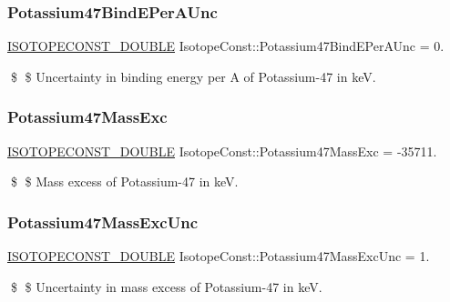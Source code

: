 \subsubsection{\texorpdfstring{Potassium47\+Bind\+E\+Per\+A\+Unc}{Potassium47BindEPerAUnc}}
{\footnotesize\ttfamily \mbox{\hyperlink{group___isotope_const-_macros_ga8f45a7272ce02c0b4c65c44636ed719a}{I\+S\+O\+T\+O\+P\+E\+C\+O\+N\+S\+T\+\_\+\+D\+O\+U\+B\+LE}} Isotope\+Const\+::\+Potassium47\+Bind\+E\+Per\+A\+Unc = 0.}

\$ \$ Uncertainty in binding energy per A of Potassium-\/47 in keV. \mbox{\label{group___isotope_const-_potassium-_k47_ga91696651c6e6d40101c8b411954b4839}} 
\subsubsection{\texorpdfstring{Potassium47\+Mass\+Exc}{Potassium47MassExc}}
{\footnotesize\ttfamily \mbox{\hyperlink{group___isotope_const-_macros_ga8f45a7272ce02c0b4c65c44636ed719a}{I\+S\+O\+T\+O\+P\+E\+C\+O\+N\+S\+T\+\_\+\+D\+O\+U\+B\+LE}} Isotope\+Const\+::\+Potassium47\+Mass\+Exc = -\/35711.}

\$ \$ Mass excess of Potassium-\/47 in keV. \mbox{\label{group___isotope_const-_potassium-_k47_gac9c03b5216737a52e4a22c6841228d04}} 
\subsubsection{\texorpdfstring{Potassium47\+Mass\+Exc\+Unc}{Potassium47MassExcUnc}}
{\footnotesize\ttfamily \mbox{\hyperlink{group___isotope_const-_macros_ga8f45a7272ce02c0b4c65c44636ed719a}{I\+S\+O\+T\+O\+P\+E\+C\+O\+N\+S\+T\+\_\+\+D\+O\+U\+B\+LE}} Isotope\+Const\+::\+Potassium47\+Mass\+Exc\+Unc = 1.}

\$ \$ Uncertainty in mass excess of Potassium-\/47 in keV. \mbox{\label{group___isotope_const-_potassium-_k47_gad6b50ad9c198a06fdea849d164071bf9}} 
